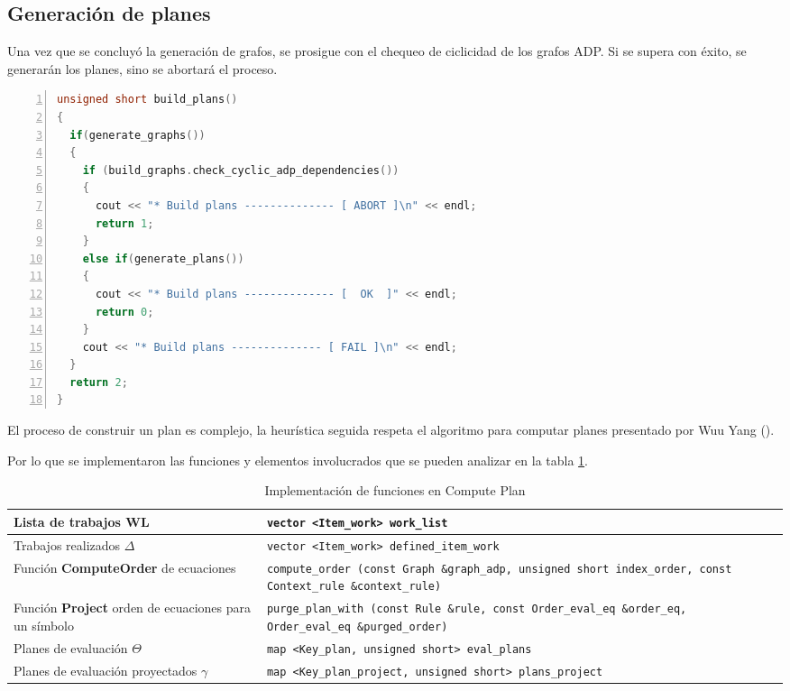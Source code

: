 \subsection{Generación de planes}
\label{sec:genplanes}

Una vez que se concluyó la generación de grafos, se prosigue con el chequeo de ciclicidad de los grafos ADP. Si se supera con éxito, se generarán los planes, sino se abortará el proceso.

\begin{lstlisting}[language=C++, basicstyle=\scriptsize, numbers=left, columns=fullflexible, linewidth=11cm]
unsigned short build_plans()
{
  if(generate_graphs())
  {
    if (build_graphs.check_cyclic_adp_dependencies())
    {
      cout << "* Build plans -------------- [ ABORT ]\n" << endl;
      return 1;
    }
    else if(generate_plans())
    {
      cout << "* Build plans -------------- [  OK  ]" << endl;
      return 0;
    }
    cout << "* Build plans -------------- [ FAIL ]\n" << endl;
  }
  return 2;
}
\end{lstlisting}
\vspace{0.3cm}

El proceso de construir un plan es complejo, la heurística seguida respeta el algoritmo para computar planes presentado por Wuu Yang (\cite{wuu-yang1}).

Por lo que se implementaron las funciones y elementos involucrados que se pueden analizar en la tabla \ref{table:map-comp-plan}.
\begin{table}[!ht]
\begin{tabular}{| p{4.5cm} | p{10.5cm} |}
\hline
Lista de trabajos \textbf{WL} & \texttt{vector <Item\_work>\ work\_list} \\ \hline

Trabajos realizados {\LARGE\textbf{$\Delta$}} & \texttt{vector <Item\_work>\ defined\_item\_work} \\ \hline

Función \textbf{ComputeOrder} de ecuaciones & \texttt{compute\_order (const Graph \&graph\_adp, unsigned short index\_order, const Context\_rule \&context\_rule)} \\ \hline

Función \textbf{Project} orden de ecuaciones para un símbolo & \texttt{purge\_plan\_with (const Rule \&rule, const Order\_eval\_eq \&order\_eq, Order\_eval\_eq \&purged\_order)} \\ \hline

Planes de evaluación {\LARGE\textbf{$\Theta$}} & \texttt{map <Key\_plan, unsigned short>\ eval\_plans} \\ \hline

Planes de evaluación \hspace{1cm}proyectados {\LARGE\textbf{$\gamma$}} & \texttt{map <Key\_plan\_project, unsigned short>\ plans\_project} \\
\hline
\end{tabular}
\caption{\label{table:map-comp-plan} Implementación de funciones en Compute Plan}
\end{table}

